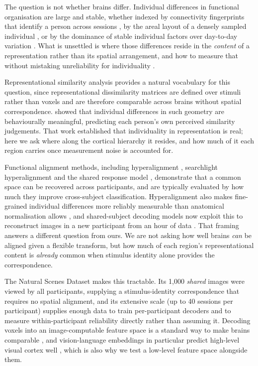 \documentclass[11pt,a4paper]{article}
\begin{document}
The question is not whether brains differ. Individual differences in functional
organisation are large and stable, whether indexed by connectivity fingerprints
that identify a person across sessions \citep{finn2015}, by the areal layout
of a densely sampled individual \citep{laumann2015,wang2015}, or by the
dominance of stable individual factors over day-to-day variation \citep{gratton2018}.
What is unsettled is where those differences reside in the \emph{content} of a
representation rather than its spatial arrangement, and how to measure that
without mistaking unreliability for individuality \citep{dubois2016,seghier2018}.

Representational similarity analysis \citep{kriegeskorte2008} provides a natural
vocabulary for this question, since representational dissimilarity matrices are
defined over stimuli rather than voxels and are therefore comparable across
brains without spatial correspondence. \citet{charest2014} showed that individual
differences in such geometry are behaviourally meaningful, predicting each
person's own perceived similarity judgements. That work established that
individuality in representation is real; here we ask where along the cortical
hierarchy it resides, and how much of it each region carries once measurement
noise is accounted for.

Functional alignment methods, including hyperalignment \citep{haxby2011}, searchlight
hyperalignment \citep{guntupalli2016} and the shared response model
\citep{chen2015}, demonstrate that a common space can be recovered across
participants, and are typically evaluated by how much they improve cross-subject
classification. Hyperalignment also makes fine-grained individual differences
more reliably measurable than anatomical normalisation allows
\citep{feilong2018}, and shared-subject decoding models now exploit this to
reconstruct images in a new participant from an hour of data
\citep{scotti2024}. That framing answers a different question from ours. We are
not asking how well brains \emph{can} be aligned given a flexible transform, but
how much of each region's representational content is \emph{already} common when
stimulus identity alone provides the correspondence.

The Natural Scenes Dataset \citep{allen2022} makes this tractable. Its 1{,}000
\emph{shared} images were viewed by all participants, supplying a
stimulus-identity correspondence that requires no spatial alignment, and its
extensive scale (up to 40 sessions per participant) supplies enough data to train
per-participant decoders and to measure within-participant reliability directly
rather than assuming it. Decoding voxels into an image-computable feature space is
a standard way to make brains comparable \citep{naselaris2011,kay2008,kamitani2005,
horikawa2017}, and vision-language embeddings in particular predict high-level
visual cortex well \citep{radford2021,wang2023}, which is also why we test a
low-level feature space alongside them.
\end{document}
